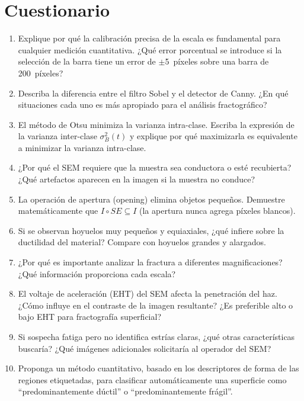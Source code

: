 \documentclass[12pt,a4paper]{article}
\begin{document}
\section{Cuestionario}
\label{sec:cuestionario}

\begin{enumerate}
	\item Explique por qué la calibración precisa de la escala es fundamental
	      para cualquier medición cuantitativa.  ¿Qué error porcentual se
	      introduce si la selección de la barra tiene un error de
	      $\pm$5~píxeles sobre una barra de 200~píxeles?

	\item Describa la diferencia entre el filtro Sobel y el detector de
	      Canny.  ¿En qué situaciones cada uno es más apropiado para el
	      análisis fractográfico?

	\item El método de Otsu minimiza la varianza intra-clase.  Escriba la
	      expresión de la varianza inter-clase $\sigma_B^2(t)$ y explique por
	      qué maximizarla es equivalente a minimizar la varianza intra-clase.

	\item ¿Por qué el SEM requiere que la muestra sea conductora o esté
	      recubierta?  ¿Qué artefactos aparecen en la imagen si la muestra
	      no conduce?

	\item La operación de apertura (opening) elimina objetos pequeños.
	      Demuestre matemáticamente que $I \circ SE \subseteq I$ (la apertura
	      nunca agrega píxeles blancos).

	\item Si se observan hoyuelos muy pequeños y equiaxiales, ¿qué infiere
	      sobre la ductilidad del material?  Compare con hoyuelos grandes
	      y alargados.

	\item ¿Por qué es importante analizar la fractura a diferentes
	      magnificaciones?  ¿Qué información proporciona cada escala?

	\item El voltaje de aceleración (EHT) del SEM afecta la penetración
	      del haz.  ¿Cómo influye en el contraste de la imagen resultante?
	      ¿Es preferible alto o bajo EHT para fractografía superficial?

	\item Si sospecha fatiga pero no identifica estrías claras,
	      ¿qué otras características buscaría?  ¿Qué imágenes adicionales
	      solicitaría al operador del SEM?

	\item Proponga un método cuantitativo, basado en los descriptores de
	      forma de las regiones etiquetadas, para clasificar automáticamente
	      una superficie como ``predominantemente dúctil'' o
	      ``predominantemente frágil''.
\end{enumerate}
\end{document}
